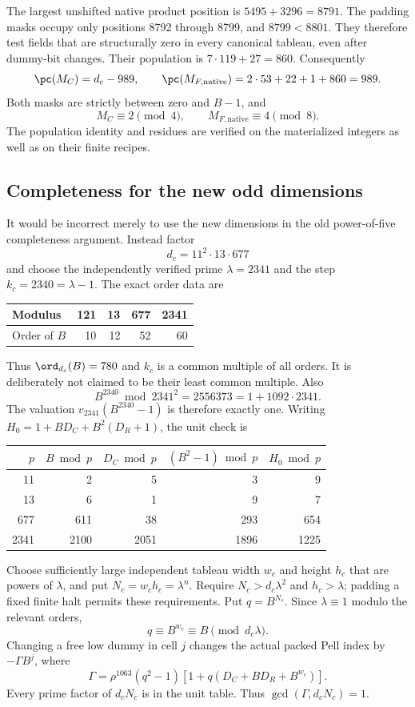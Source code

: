The largest unshifted native product position is
$5495+3296=8791$. The padding masks occupy only positions 8792 through
8799, and $8799<8801$. They therefore test fields that are structurally
zero in every canonical tableau, even after dummy-bit changes. Their
population is $7\cdot119+27=860$. Consequently
\[
 \pc(M_C)=d_c-989,
 \qquad\pc(M_{F,\mathrm{native}})=2\cdot53+22+1+860=989.
\]
Both masks are strictly between zero and $B-1$, and
\[
 M_C\equiv2\pmod4,\qquad M_{F,\mathrm{native}}\equiv4\pmod8.
\]
The population identity and residues are verified on the materialized
integers as well as on their finite recipes.

\subsection{Completeness for the new odd dimensions}

It would be incorrect merely to use the new dimensions in the old
power-of-five completeness argument. Instead factor
\[
 d_c=11^2\cdot13\cdot677
\]
and choose the independently verified prime
$\lambda=2341$ and the step $k_c=2340=\lambda-1$.
The exact order data are
\begin{center}
\begin{tabular}{@{}lrrrr@{}}\toprule
Modulus & 121 & 13 & 677 & 2341\\\midrule
Order of $B$ & 10 & 12 & 52 & 60\\\bottomrule
\end{tabular}
\end{center}
Thus $\ord_{d_c}(B)=780$ and $k_c$ is a common multiple of all
orders. It is deliberately not claimed to be their least common multiple.
Also
\[
 B^{2340}\bmod2341^2=2556373=1+1092\cdot2341.
\]
The valuation $v_{2341}(B^{2340}-1)$ is therefore exactly one.
Writing $H_0=1+BD_C+B^2(D_R+1)$, the unit check is
\begin{center}
\begin{tabular}{@{}rrrrr@{}}\toprule
$p$ & $B\bmod p$ & $D_C\bmod p$ & $(B^2-1)\bmod p$ & $H_0\bmod p$\\\midrule
11 & 2 & 5 & 3 & 9\\
13 & 6 & 1 & 9 & 7\\
677 & 611 & 38 & 293 & 654\\
2341 & 2100 & 2051 & 1896 & 1225\\\bottomrule
\end{tabular}
\end{center}

Choose sufficiently large independent tableau width $w_c$ and height
$h_c$ that are powers of $\lambda$, and put $N_c=w_ch_c=\lambda^n$.
Require $N_c>d_c\lambda^2$ and $h_c>\lambda$; padding a fixed finite
halt permits these requirements. Put $q=B^{N_c}$. Since
$\lambda\equiv1$ modulo the relevant orders,
\[
 q\equiv B^{w_c}\equiv B\pmod{d_c\lambda}.
\]
Changing a free low dummy in cell $j$ changes the actual packed Pell
index by $-\Gamma B^j$, where
\[
 \Gamma=\rho^{1063}(q^2-1)
             [1+q(D_C+BD_R+B^{w_c})].
\]
Every prime factor of $d_cN_c$ is in the unit table. Thus
$\gcd(\Gamma,d_cN_c)=1$.

